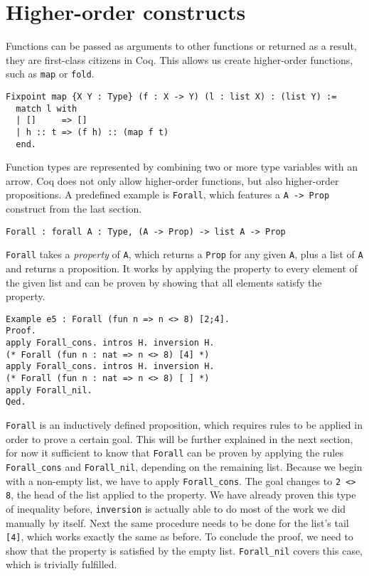 \documentclass[fleqn]{scrreprt}
\newcommand{\todo}[1]{\marginpar{\textbf{TODO:} #1}}
\newcommand{\coqinline}[1]{\texttt{#1}}
\begin{document}
\section{Higher-order constructs}
Functions can be passed as arguments to other functions or returned as a result, they are first-class citizens in Coq. This allows us create higher-order functions, such as \coqinline{map} or \coqinline{fold}.
\todo{minted bug?}
\begin{verbatim}
Fixpoint map {X Y : Type} (f : X -> Y) (l : list X) : (list Y) :=
  match l with
  | []     => []
  | h :: t => (f h) :: (map f t)
  end.
\end{verbatim}
Function types are represented by combining two or more type variables with an arrow. Coq does not only allow higher-order functions, but also higher-order propositions. A predefined example is \coqinline{Forall}, which features a \coqinline{A -> Prop} construct from the last section.
\begin{verbatim}
Forall : forall A : Type, (A -> Prop) -> list A -> Prop
\end{verbatim}
\coqinline{Forall} takes a \textit{property} of \coqinline{A}, which returns a \coqinline{Prop} for any given \coqinline{A}, plus a list of \coqinline{A} and returns a proposition. It works by applying the property to every element of the given list and can be proven by showing that all elements satisfy the property.
\begin{verbatim}
Example e5 : Forall (fun n => n <> 8) [2;4].
Proof.
apply Forall_cons. intros H. inversion H.
(* Forall (fun n : nat => n <> 8) [4] *)
apply Forall_cons. intros H. inversion H.
(* Forall (fun n : nat => n <> 8) [ ] *)
apply Forall_nil.
Qed.
\end{verbatim}
\coqinline{Forall} is an inductively defined proposition, which requires rules to be applied in order to prove a certain goal. This will be further explained in the next section, for now it sufficient to know that \coqinline{Forall} can be proven by applying the rules \coqinline{Forall_cons} and \coqinline{Forall_nil}, depending on the remaining list. Because we begin with a non-empty list, we have to apply \coqinline{Forall_cons}. The goal changes to \coqinline{2 <> 8}, the head of the list applied to the property. We have already proven this type of inequality before, \coqinline{inversion} is actually able to do most of the work we did manually by itself. Next the same procedure needs to be done for the list's tail \coqinline{[4]}, which works exactly the same as before. To conclude the proof, we need to show that the property is satisfied by the empty list. \coqinline{Forall_nil} covers this case, which is trivially fulfilled.
\end{document}
